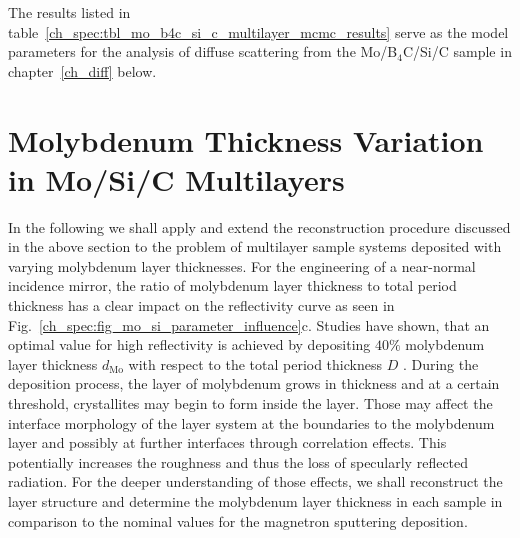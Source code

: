 The results listed in table~\ref{ch_spec:tbl_mo_b4c_si_c_multilayer_mcmc_results} serve as the model parameters for the analysis of diffuse scattering from the Mo/B$_4$C/Si/C sample in chapter~\ref{ch_diff} below.

\section{Molybdenum Thickness Variation in Mo/Si/C Multilayers}
In the following we shall apply and extend the reconstruction procedure discussed in the above section to the problem of multilayer sample systems deposited with varying molybdenum layer thicknesses. For the engineering of a near-normal incidence mirror, the ratio of molybdenum layer thickness to total period thickness has a clear impact on the reflectivity curve as seen in Fig.~\ref{ch_spec:fig_mo_si_parameter_influence}c. Studies have shown, that an optimal value for high reflectivity is achieved by depositing $40\%$ molybdenum layer thickness $d_\text{Mo}$ with respect to the total period thickness $D$ \cite{bajt_investigation_2001,braun_mo/si_2002}. During the deposition process, the layer of molybdenum grows in thickness and at a certain threshold, crystallites may begin to form \cite{verhoeven_ion_1992,bajt_investigation_2001} inside the layer. Those may affect the interface morphology of the layer system at the boundaries to the molybdenum layer and possibly at further interfaces through correlation effects. This potentially increases the roughness and thus the loss of specularly reflected radiation. For the deeper understanding of those effects, we shall reconstruct the layer structure and determine the molybdenum layer thickness in each sample in comparison to the nominal values for the magnetron sputtering deposition.

